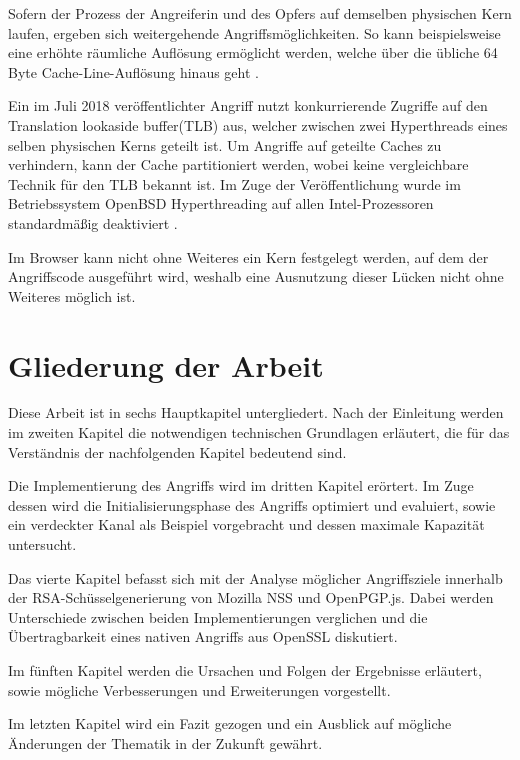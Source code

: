 Sofern der Prozess der Angreiferin und des Opfers auf demselben physischen Kern laufen, ergeben sich weitergehende Angriffsmöglichkeiten.
So kann beispielsweise eine erhöhte räumliche Auflösung ermöglicht werden, welche über die übliche 64 Byte Cache-Line-Auflösung hinaus geht \cite{MemJam}.

Ein im Juli 2018 veröffentlichter Angriff \cite{TLBleed} nutzt konkurrierende Zugriffe auf den Translation lookaside buffer(TLB) aus, welcher zwischen zwei Hyperthreads eines selben physischen Kerns geteilt ist.
Um Angriffe auf geteilte Caches zu verhindern, kann der Cache partitioniert werden, wobei keine vergleichbare Technik für den TLB bekannt ist.
Im Zuge der Veröffentlichung wurde im Betriebssystem OpenBSD Hyperthreading auf allen Intel-Prozessoren standardmäßig deaktiviert \cite{OpenBSDHyperthreading}.

Im Browser kann nicht ohne Weiteres ein Kern festgelegt werden, auf dem der Angriffscode ausgeführt wird, weshalb eine Ausnutzung dieser Lücken nicht ohne Weiteres möglich ist.

\section{Gliederung der Arbeit}
Diese Arbeit ist in sechs Hauptkapitel untergliedert. 
Nach der Einleitung werden im zweiten Kapitel die notwendigen technischen Grundlagen erläutert, die für das Verständnis der nachfolgenden Kapitel bedeutend sind.

Die Implementierung des Angriffs wird im dritten Kapitel erörtert. 
Im Zuge dessen wird die Initialisierungsphase des Angriffs optimiert und evaluiert, sowie ein verdeckter Kanal als Beispiel vorgebracht und dessen maximale Kapazität untersucht.

Das vierte Kapitel befasst sich mit der Analyse möglicher Angriffsziele innerhalb der RSA-Schüsselgenerierung von Mozilla NSS und OpenPGP.js.
Dabei werden Unterschiede zwischen beiden Implementierungen verglichen und die Übertragbarkeit eines nativen Angriffs aus OpenSSL diskutiert.

Im fünften Kapitel werden die Ursachen und Folgen der Ergebnisse erläutert, sowie mögliche Verbesserungen und Erweiterungen vorgestellt.

Im letzten Kapitel wird ein Fazit gezogen und ein Ausblick auf mögliche Änderungen der Thematik in der Zukunft gewährt.